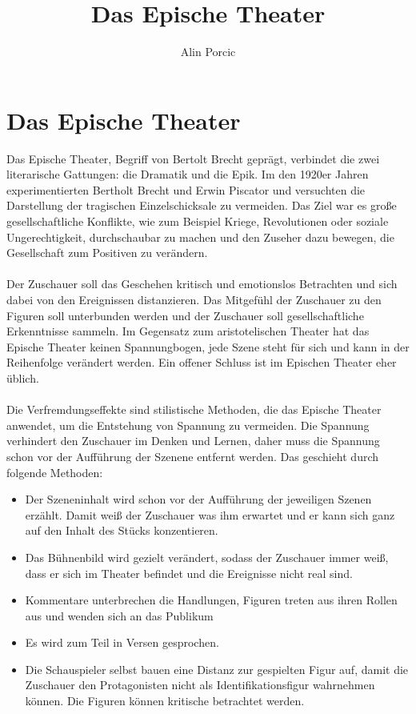 \documentclass[a4paper]{article}
\title{Das Epische Theater}
\author{Alin Porcic}
\begin{document}
	\maketitle

	\newpage
	\section{Das Epische Theater}

        Das Epische Theater, Begriff von Bertolt Brecht geprägt, verbindet die zwei literarische Gattungen: die Dramatik und die Epik. Im den 1920er Jahren experimentierten Bertholt Brecht und Erwin Piscator und versuchten die Darstellung der tragischen Einzelschicksale zu vermeiden. Das Ziel war es große gesellschaftliche Konflikte, wie zum Beispiel Kriege, Revolutionen oder soziale Ungerechtigkeit, durchschaubar zu machen und den Zuseher dazu bewegen, die Gesellschaft zum Positiven zu verändern.\\\\

        Der Zuschauer soll das Geschehen kritisch und emotionslos Betrachten und sich dabei von den Ereignissen distanzieren. Das Mitgefühl der Zuschauer zu den Figuren soll unterbunden werden und der Zuschauer soll gesellschaftliche Erkenntnisse sammeln. Im Gegensatz zum aristotelischen Theater hat das Epische Theater keinen Spannungbogen, jede Szene steht für sich und kann in der Reihenfolge verändert werden. Ein offener Schluss ist im Epischen Theater eher üblich.\\\\

	Die Verfremdungseffekte sind stilistische Methoden, die das Epische Theater anwendet, um die Entstehung von Spannung zu vermeiden. Die Spannung verhindert den Zuschauer im Denken und Lernen, daher muss die Spannung schon vor der Aufführung der Szenene entfernt werden. Das geschieht durch folgende Methoden:
        
        \begin{itemize}
	\item Der Szeneninhalt wird schon vor der Aufführung der jeweiligen Szenen erzählt. Damit weiß der Zuschauer was ihm erwartet und er kann sich ganz auf den Inhalt des Stücks konzentieren.
        \item Das Bühnenbild wird gezielt verändert, sodass der Zuschauer immer weiß, dass er sich im Theater befindet und die Ereignisse nicht real sind.
        \item Kommentare unterbrechen die Handlungen, Figuren treten aus ihren Rollen aus und wenden sich an das Publikum
        \item Es wird zum Teil in Versen gesprochen.
        \item Die Schauspieler selbst bauen eine Distanz zur gespielten Figur auf, damit die Zuschauer den Protagonisten nicht als Identifikationsfigur wahrnehmen können. Die Figuren können kritische betrachtet werden.
        \end{itemize}
        
\end{document}
